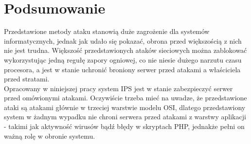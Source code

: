 \chapter*{Podsumowanie}
	Przedstawione metody ataku stanowią duże zagrożenie dla systemów informatycznych, jednak jak udało się pokazać, obrona przed większością z nich nie jest trudna.
	Większość przedstawionych ataków sieciowych można zablokować wykorzystując jedną regułę zapory ogniowej, co nie niesie dużego narzutu czasu procesora, a jest w stanie uchronić broniony serwer przed atakami a właściciela przed stratami.\\
	Opracowany w niniejszej pracy system IPS jest w stanie zabezpieczyć serwer przed omówionymi atakami.
	Oczywiście trzeba mieć na uwadze, że przedstawione ataki są atakami głównie w trzeciej warstwie modelu OSI, dlatego przedstawiony system w żadnym wypadku nie chroni serwera przed atakami z warstwy aplikacji - takimi jak aktywność wirusów bądź błędy w skryptach PHP, jednakże pełni on ważną rolę w obronie systemu.
	
